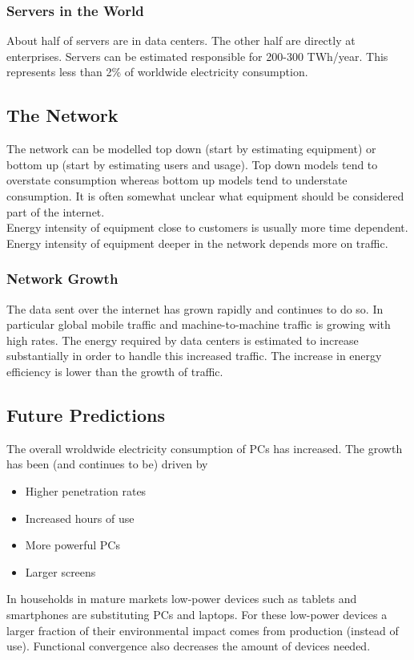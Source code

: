 \subsubsection{Servers in the World}
About half of servers are in data centers.
The other half are directly at enterprises.
Servers can be estimated responsible for 200-300 TWh/year.
This represents less than 2\% of worldwide electricity consumption.

\subsection{The Network}
The network can be modelled top down (start by estimating equipment) or bottom up (start by estimating users and usage).
Top down models tend to overstate consumption whereas bottom up models tend to understate consumption.
It is often somewhat unclear what equipment should be considered part of the internet.\\

Energy intensity of equipment close to customers is usually more time dependent.
Energy intensity of equipment deeper in the network depends more on traffic.

\subsubsection{Network Growth}
The data sent over the internet has grown rapidly and continues to do so.
In particular global mobile traffic and machine-to-machine traffic is growing with high rates.
The energy required by data centers is estimated to increase substantially in order to handle this increased traffic.
The increase in energy efficiency is lower than the growth of traffic.

\subsection{Future Predictions}
The overall wroldwide electricity consumption of PCs has increased.
The growth has been (and continues to be) driven by

\begin{itemize}
    \item Higher penetration rates
    \item Increased hours of use
    \item More powerful PCs
    \item Larger screens
\end{itemize}

In households in mature markets low-power devices such as tablets and smartphones are substituting PCs and laptops.
For these low-power devices a larger fraction of their environmental impact comes from production (instead of use).
Functional convergence also decreases the amount of devices needed.

